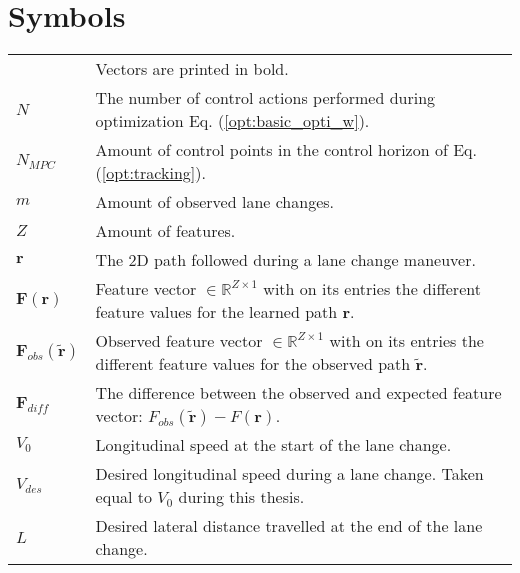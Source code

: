 \documentclass[master=wtk,english]{kulemt}
\begin{document}
\section*{Symbols}
\begin{flushleft}
  \renewcommand{\arraystretch}{1.1}
  \begin{tabularx}{\textwidth}{@{}p{12mm}X@{}}
  		& Vectors are printed in bold. \\
    $N$    &  The number of control actions performed during optimization Eq. (\ref{opt:basic_opti_w}). \\
    $N_{MPC}$ & Amount of control points in the control horizon of Eq. (\ref{opt:tracking}).\\
    $m$ & Amount of observed lane changes.\\
    $Z$ & Amount of features.\\
    $\bm{r}$ & The 2D path followed during a lane change maneuver.\\
    $\bm{F}(\bm{r})$ & Feature vector $\in \mathbb{R}^{Z\times 1}$ with on its entries the different feature values for the learned path $\bm{r}$.\\
    $\bm{F}_{obs}(\bm{\tilde{r}})$ & Observed feature vector $\in \mathbb{R}^{Z\times 1}$ with on its entries the different feature values for the observed path $\bm{\tilde{r}}$.\\
    $\bm{F}_{diff}$ & The difference between the observed and expected feature vector: $F_{obs}(\bm{\tilde{r}}) - F(\bm{r})$.\\
    $V_{0}$ & Longitudinal speed at the start of the lane change.\\
    $V_{des}$ & Desired longitudinal speed during a lane change. Taken equal to $V_{0}$ during this thesis.\\
   $L$   & Desired lateral distance travelled at the end of the lane change.
    
    
 
	\end{tabularx}
\end{flushleft}
\end{document}
